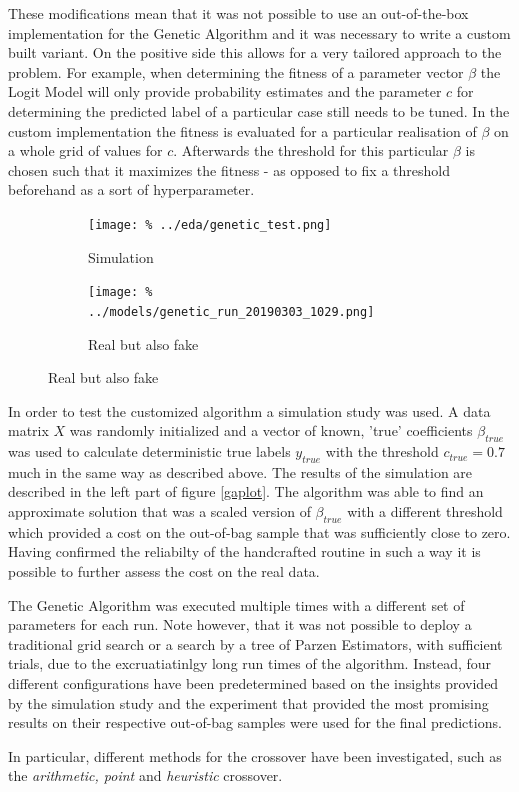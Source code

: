 These modifications mean that it was not possible to use an out-of-the-box implementation for the Genetic Algorithm and it was necessary to write a custom built variant. On the positive side this allows for a very tailored approach to the problem. For example, when determining the fitness of a parameter vector $\beta$ the Logit Model will only provide probability estimates and the parameter $c$ for determining the predicted label of a particular case still needs to be tuned. In the custom implementation the fitness is evaluated for a particular realisation of $\beta$ on a whole grid of values for $c$. Afterwards the threshold for this particular $\beta$ is chosen such that it maximizes the fitness - as opposed to fix a threshold beforehand as a sort of hyperparameter.

\begin{figure}
\centering
\caption{Results of the Genetic Algorithm}\label{gaplot}
\begin{subfigure}[b]{0.5\textwidth}            
            \texttt{[image: \%
            ../eda/genetic\_test.png]}
            \caption{Simulation}
    \end{subfigure}%
    \begin{subfigure}[b]{0.5\textwidth}
            \centering
            \texttt{[image: \%
            ../models/genetic\_run\_20190303\_1029.png]}
            \caption{Real but also fake}
    \end{subfigure}
\end{figure}


 In order to test the customized algorithm a simulation study was used. A data matrix $X$ was randomly initialized and a vector of known, 'true' coefficients $\beta_{true}$ was used to calculate deterministic true labels $y_{true}$ with the threshold $c_{true} = 0.7$ much in the same way as described above. The results of the simulation are described in the left part of figure \ref{gaplot}. The algorithm was able to find an approximate solution that was a scaled version of $\beta_{true}$ with a different threshold which provided a cost on the out-of-bag sample that was sufficiently close to zero. Having confirmed the reliabilty of the handcrafted routine in such a way it is possible to further assess the cost on the real data.

The Genetic Algorithm was executed multiple times with a different set of parameters for each run. Note however, that it was not possible to deploy a traditional grid search or a search by a tree of Parzen Estimators, with sufficient trials, due to the excruatiatinlgy long run times of the algorithm. Instead, four different configurations have been predetermined based on the insights provided by the simulation study and the experiment that provided the most promising results on their respective out-of-bag samples were used for the final predictions.

In particular, different methods for the crossover have been investigated, such as the \emph{arithmetic, point} and \emph{heuristic} crossover. 